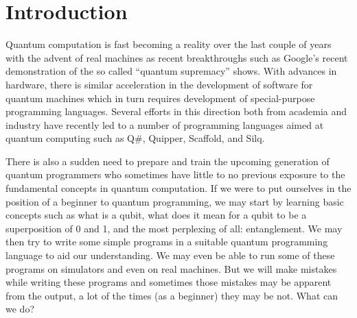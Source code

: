 \documentclass[adraft,creativecommons]{eptcs}
\title{\titlerunning}
\author{
\authorrunning
\institute{University of Chicago}
\email{\mailtodomain{ks@cs.uchicago.edu}}
}
\theoremstyle{definition}
\theoremstyle{remark}
\begin{document}
\maketitle

\begin{abstract}
    As quantum computers become real, it is high time we come up with effective techniques that help programmers write correct quantum programs. In classical computing, formal verification and sound static type systems prevent several classes of bugs from being introduced. There is a need for similar techniques in the quantum regime. Inspired by Hoare Type Theory in the classical paradigm, we propose Quantum Hoare Types by extending the Quantum IO Monad by indexing it with pre- and postconditions that serve as program specifications. In this paper, we introduce Quantum Hoare Type Theory (QHTT), present its syntax and typing rules, and demonstrate its effectiveness with the help of examples.

    QHTT has the potential to be a unified system for programming, specifying, and reasoning about quantum programs.
\end{abstract}

\thispagestyle{empty}

\tableofcontents

\listoftables

\listoffigures

\lstlistoflistings

\setlength{\parskip}{1em}

\section{Introduction}

Quantum computation is fast becoming a reality over the last couple of years with the advent of real machines as recent breakthroughs such as Google's recent demonstration of the so called ``quantum supremacy'' shows. With advances in hardware, there is similar acceleration in the development of software for quantum machines which in turn requires development of special-purpose programming languages. Several efforts in this direction both from academia and industry have recently led to a number of programming languages aimed at quantum computing such as Q\#, Quipper, Scaffold, and Silq.

There is also a sudden need to prepare and train the upcoming generation of quantum programmers who sometimes have little to no previous exposure to the fundamental concepts in quantum computation. If we were to put ourselves in the position of a beginner to quantum programming, we may start by learning basic concepts such as what is a qubit, what does it mean for a qubit to be a superposition of 0 and 1, and the most perplexing of all: entanglement. We may then try to write some simple programs in a suitable quantum programming language to aid our understanding. We may even be able to run some of these programs on simulators and even on real machines. But we will make mistakes while writing these programs and sometimes those mistakes may be apparent from the output, a lot of the times (as a beginner) they may be not. What can we do?
\end{document}
